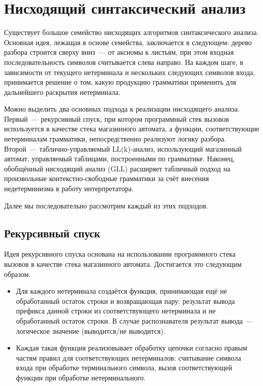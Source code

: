 \section{Нисходящий синтаксический анализ}
\label{sec:TopDown}

Существует большое семейство нисходящих алгоритмов синтаксического анализа.
Основная идея, лежащая в основе семейства, заключается в следующем: дерево разбора строится сверху вниз~--- от аксиомы к листьям, при этом входная последовательность символов считывается слева направо. На каждом шаге, в зависимости от текущего нетерминала и нескольких следующих символов входа, принимается решение о том, какую продукцию грамматики применить для дальнейшего раскрытия нетерминала.

Можно выделить два основных подхода к реализации нисходящего анализа. Первый~--- рекурсивный спуск, при котором программный стек вызовов используется в качестве стека магазинного автомата, а функции, соответствующие нетерминалам грамматики, непосредственно реализуют логику разбора. Второй~--- таблично-управляемый LL(k)-анализ, использующий магазинный автомат, управляемый таблицами, построенными по грамматике. Наконец, обобщённый нисходящий анализ (GLL) расширяет табличный подход на произвольные контекстно-свободные грамматики за счёт внесения недетерминизма в работу интерпретатора.

Далее мы последовательно рассмотрим каждый из этих подходов.

\subsection{Рекурсивный спуск}

Идея рекурсивного спуска основана на использовании программного стека вызовов в качестве стека магазинного автомата. Достигается это следующим образом.
\begin{itemize}
  \item Для каждого нетерминала создаётся функция, принимающая ещё не обработанный остаток строки и возвращающая пару: результат вывода префикса данной строки из соответствующего нетерминала и не обработанный остаток строки. В случае распознавателя результат вывода~--- логическое значение (выводится/не выводится).
  \item Каждая такая функция реализовывает обработку цепочки согласно правым частям правил для соответствующих нетерминалов: считывание символа входа при обработке терминального символа, вызов соответствующей функции при обработке нетерминального.
\end{itemize}

